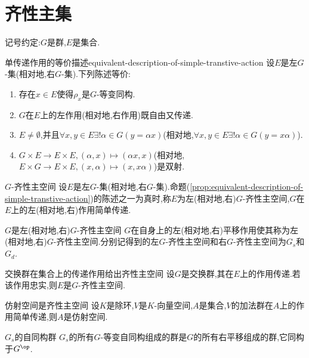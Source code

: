 \section{齐性主集}

记号约定:$G$是群,$E$是集合.

\begin{proposition}{单传递作用的等价描述}{equivalent-description-of-simple-transtive-action}
	设$E$是左$G$-集(相对地,右$G$-集).下列陈述等价:
	\begin{enumerate}
		\item 存在$x\in E$使得$\rho_{x}$是$G$-等变同构.
		\item $G$在$E$上的左作用(相对地,右作用)既自由又传递.
		\item $E\neq\emptyset$,并且$\forall x,y\in E\exists!\alpha\in G\left(y=\alpha x\right)$(相对地,$\forall x,y\in E\exists!\alpha\in G\left(y=x\alpha\right)$).
		\item $G\times E\to E\times E,\left(\alpha,x\right)\mapsto\left(\alpha x,x\right)$(相对地,$E\times G\to E\times E,\left(x,\alpha\right)\mapsto\left(x,x\alpha\right)$)是双射.
	\end{enumerate}
\end{proposition}

\begin{definition}{$G$-齐性主空间}{}
	设$E$是左$G$-集(相对地,右$G$-集).命题(\ref{prop:equivalent-description-of-simple-transtive-action})的陈述之一为真时,称$E$为左(相对地,右)$G$-齐性主空间,$G$在$E$上的左(相对地,右)作用简单传递.
\end{definition}

\begin{example}{$G$是左(相对地,右)$G$-齐性主空间}{}
	$G$在自身上的左(相对地,右)平移作用使其称为左(相对地,右)$G$-齐性主空间.分别记得到的左$G$-齐性主空间和右$G$-齐性主空间为$G_{s}$和$G_{d}$.
\end{example}

\begin{example}{交换群在集合上的传递作用给出齐性主空间}{}
	设$G$是交换群,其在$E$上的作用传递.若该作用忠实,则$E$是$G$-齐性主空间.
\end{example}

\begin{example}{仿射空间是齐性主空间}{}
	设$K$是除环,$V$是$K$-向量空间,$A$是集合,$V$的加法群在$A$上的作用简单传递,则$A$是仿射空间.
\end{example}

\begin{proposition}{$G_{s}$的自同构群}{}
	$G_{s}$的所有$G$-等变自同构组成的群是$G$的所有右平移组成的群,它同构于$G^{\op}$.
\end{proposition}

